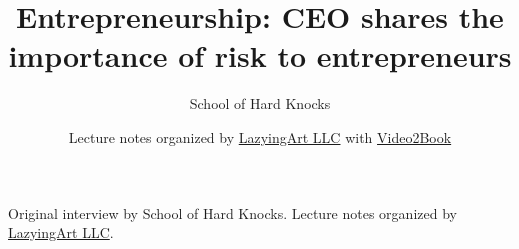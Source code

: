 \documentclass[11pt,oneside]{book}
\begin{document}
\frontmatter
\title{Entrepreneurship: CEO shares the importance of risk to entrepreneurs}
\author{School of Hard Knocks}
\date{Lecture notes organized by \href{https://lazying.art}{LazyingArt LLC} with \href{https://github.com/lachlanchen/Video2Book}{Video2Book}}
\maketitle
\begin{center}
\small Original interview by School of Hard Knocks. Lecture notes organized by \href{https://lazying.art}{LazyingArt LLC}.
\end{center}
\clearpage
\mainmatter

\end{document}
